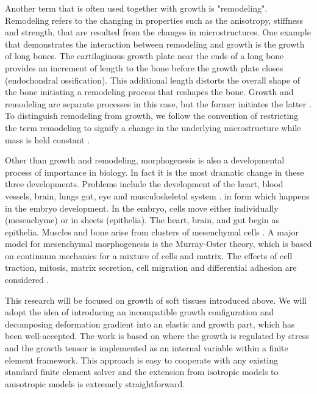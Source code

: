 Another term that is often used together with growth is "remodeling". Remodeling refers to the changing in properties such as the anisotropy, stiffness and strength, that are resulted from the changes in microstructures. One example that demonstrates the interaction between remodeling and growth is the growth of long bones. The cartilaginous growth plate near the ends of a long bone provides an increment of length to the bone before the growth plate closes (endochondral ossification). This additional length distorts the overall shape of the bone initiating a remodeling process that reshapes the bone. Growth and remodeling are separate processes in this case, but the former initiates the latter \cite{Ambrosi}. To distinguish remodeling from growth, we follow the convention of restricting the term remodeling to signify a change in the underlying microstructure while mass is held constant \cite{Kuhl4, Garikipati3}.

Other than growth and remodeling, morphogenesis is  also a developmental process of importance in biology. In fact it is the most dramatic change in these three developments. Problems include the development of the heart, blood vessels, brain, lungs gut, eye and musculoskeletal system \cite{Murray}. in form which happens in the embryo development. In the embryo, cells move either individually (mesenchyme) or in sheets (epithelia). The heart, brain, and gut begin as epithelia. Muscles and bone arise from clusters of mesenchymal cells \cite{Ambrosi}. A major model for mesenchymal morphogenesis is the Murray-Oster theory, which is based on continuum mechanics for a mixture of cells and matrix. The effects of cell traction, mitosis, matrix secretion, cell migration and differential adhesion are considered \cite{Murray2, Oster}.

This research will be focused on growth of soft tissues introduced above. We will adopt the idea of introducing an incompatible growth configuration and decomposing deformation gradient into an elastic and growth part, which has been well-accepted. The work is based on \cite{Himpel, Kuhl3, Goktepe2} where the growth is regulated by stress and the growth tensor is implemented as an internal variable within a finite element framework. This approach is easy to cooperate with any existing standard finite element solver and the extension from isotropic models to anisotropic models is extremely straightforward.